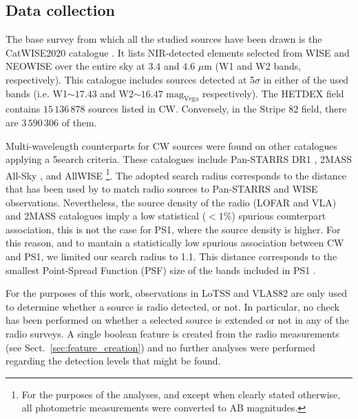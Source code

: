 \documentclass{aa}
\begin{document}
\subsection{Data collection}\label{sec:data_collection}

The base survey from which all the studied sources have been drawn is the CatWISE2020 catalogue \citep[CW;][]{2021ApJS..253....8M}. It lists NIR-detected elements selected from WISE \citep{2010AJ....140.1868W} and NEOWISE \citep{2011ApJ...731...53M, 2014ApJ...792...30M} over the entire sky at $3.4$ and $4.6$ $\mu$m (W1 and W2 bands, respectively). This catalogue includes sources detected at 5$\sigma$ in either of the used bands (i.e. W1${\sim} 17.43$ and W2${\sim} 16.47$ $\mathrm{mag}_{\mathrm{Vega}}$ respectively). The HETDEX field contains $15\,136\,878$ sources listed in CW. Conversely, in the Stripe 82 field, there are $3\,590\,306$ of them.

Multi-wavelength counterparts for CW sources were found on other catalogues applying a 5\arcsec search criteria. These catalogues include Pan-STARRS DR1 \citep[PS1;][]{2016arXiv161205560C, 2020ApJS..251....7F}, 2MASS All-Sky \citep[2M;][]{2006AJ....131.1163S, 2003tmc..book.....C, 2003yCat.2246....0C}, and AllWISE \citep[AW;][]{2013wise.rept....1C}\footnote{For the purposes of the analyses, and except when clearly stated otherwise, all photometric measurements were converted to AB magnitudes.}. The adopted search radius corresponds to the distance that has been used by \citet{2010AJ....140.1868W} to match radio sources to Pan-STARRS and WISE observations. Nevertheless, the source density of the radio (LOFAR and VLA) and 2MASS catalogues imply a low statistical ($<1\%$) spurious counterpart association, this is not the case for PS1, where the source density is higher. For this reason, and to mantain a statistically low spurious association between CW and PS1, we limited our search radius to 1.1\arcsec. This distance corresponds to the smallest Point-Spread Function (PSF) size of the bands included in PS1 \citep{2016arXiv161205560C}.

For the purposes of this work, observations in LoTSS and VLAS82 are only used to determine whether a source is radio detected, or not. In particular, no check has been performed on whether a selected source is extended or not in any of the radio surveys. A single boolean feature is created from the radio measurements (see Sect.~\ref{sec:feature_creation}) and no further analyses were performed regarding the detection levels that might be found.
\end{document}
